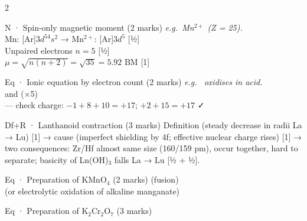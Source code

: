 \documentclass[10pt,a4paper]{extarticle}
\newcommand{\mk}[1]{{\scriptsize\color{black!55}[#1]}}
\begin{document}
\begin{multicols}{2}
\begin{skel}{N · Spin-only magnetic moment (2 marks)}
\textit{e.g.\ Mn$^{2+}$ (Z = 25).}\\
Mn: [Ar]$3d^54s^2$ → Mn$^{2+}$: [Ar]$3d^5$ \mk{½}\\
Unpaired electrons $n=5$ \mk{½}\\
$\mu=\sqrt{n(n+2)}=\sqrt{35}=\boxed{5.92\text{ BM}}$ \mk{1}
\end{skel}
\begin{skel}{Eq · Ionic equation by electron count (2 marks)}
\textit{e.g.\  oxidises  in acid.}\\
 \;\;and\;\;  (×5)\\
 — check charge: $-1+8+10=+17$; $+2+15=+17$ ✓
\end{skel}
\begin{skel}{Df+R · Lanthanoid contraction (3 marks)}
Definition (steady decrease in radii La → Lu) \mk{1} → cause (imperfect shielding by 4f; effective nuclear charge rises) \mk{1} → two consequences: Zr/Hf almost same size (160/159 pm), occur together, hard to separate; basicity of Ln(OH)$_3$ falls La → Lu \mk{½ + ½}.
\end{skel}
\begin{skel}{Eq · Preparation of KMnO$_4$ (2 marks)}
 (fusion)\\
 (or electrolytic oxidation of alkaline manganate)
\end{skel}
\begin{skel}{Eq · Preparation of K$_2$Cr$_2$O$_7$ (3 marks)}
\\
\\
\end{skel}


\end{multicols}
\end{document}
